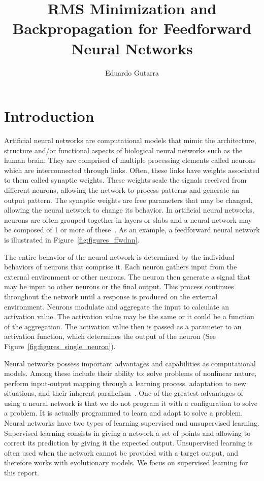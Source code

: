 \documentclass[11pt]{article}
\title{RMS Minimization and Backpropagation for Feedforward Neural Networks}
\author{Eduardo Gutarra}
\begin{document}
	
\ifpdf
{}
\else
{}
\fi
	
\maketitle
	
\section{Introduction} %
\label{sec:introduction}

Artificial neural networks are computational models that mimic the architecture, structure and/or functional aspects of biological
neural networks such as the human brain. They are comprised of multiple processing elements called neurons which are interconnected
through links. Often, these links have weights associated to them called synaptic weights. These weights scale the signals received from
different neurons, allowing the network to process patterns and generate an output pattern. The synaptic weights are free parameters
that may be changed, allowing the neural network to change its behavior. In artificial neural networks, neurons are often grouped
together in layers or slabs and a neural network may be composed of 1 or more of these~\cite{skapura}. As an example, a feedforward
neural network is illustrated in Figure~\ref{fig:figures_ffwdnn}.

The entire behavior of the neural network is determined by the individual behaviors of neurons that comprise it. Each neuron gathers
input from the external environment or other neurons. The neuron then generate a signal that may be input to other neurons or the final
output. This process continues throughout the network until a response is produced on the external environment. Neurons modulate and
aggregate the input to calculate an activation value. The activation value may be the same or it could be a function of the aggregation.
The activation value then is passed as a parameter to an activation function, which determines the output of the neuron (See Figure~\ref{fig:figures_single_neuron}).

Neural networks possess important advantages and capabilities as computational models. Among these include their ability to: solve
problems of nonlinear nature, perform input-output mapping through a learning process, adaptation to new situations, and their inherent
parallelism~\cite{Haykin:1994:NNC:541500}. One of the greatest advantages of using a neural network is that we do not program it with a
configuration to solve a problem. It is actually programmed to learn and adapt to solve a problem. Neural networks have two types of
learning supervised and unsupervised learning. Supervised learning consists in giving a network a set of points and allowing to correct
its prediction by giving it the expected output. Unsupervised learning is often used when the network cannot be provided with a target
output, and therefore works with evolutionary models. We focus on supervised learning for this report.
\end{document}
